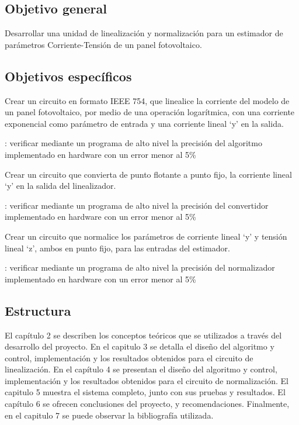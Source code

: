 \subsection{Objetivo general}

Desarrollar una unidad de linealización y normalización para un estimador de parámetros Corriente-Tensión de un panel fotovoltaico.

\subsection{Objetivos específicos}

\begin{compactitem}
\item Crear un circuito en formato IEEE 754, que linealice la corriente del modelo de un panel fotovoltaico, por medio de una operación logarítmica, con una corriente exponencial como parámetro de entrada y una corriente lineal ‘y’ en la salida.

: verificar mediante un programa de alto nivel la precisión del algoritmo implementado en hardware con un error menor al 5\%

\item Crear un circuito que convierta de punto flotante a punto fijo, la corriente lineal ‘y’ en la salida del linealizador.

: verificar mediante un programa de alto nivel la precisión del convertidor implementado en hardware con un error menor al 5\%

\item Crear un circuito que normalice los parámetros de corriente lineal ‘y’ y tensión lineal ‘z’, ambos en punto fijo, para las entradas del estimador. 

: verificar mediante un programa de alto nivel la precisión del normalizador implementado en hardware con un error menor al 5\%


\end{compactitem}

\subsection{Estructura}
El capítulo 2 se describen los conceptos teóricos que se utilizados a través del desarrollo del proyecto. En el capitulo 3 se detalla el diseño del algoritmo y control, implementación y los resultados obtenidos para el circuito de linealización. En el capítulo 4 se presentan el diseño del algoritmo y control, implementación y los resultados obtenidos para el circuito de normalización. El capitulo 5 muestra el sistema completo, junto con sus pruebas y resultados.  El capítulo 6 se ofrecen conclusiones del proyecto, y recomendaciones. Finalmente, en el capitulo 7 se puede observar la bibliografía utilizada. 




